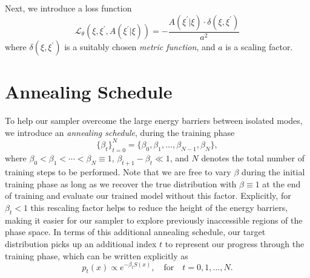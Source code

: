 \documentclass{article} %
\begin{document}
Next, we introduce a loss function
%
\begin{equation}
   \mathcal{L}_{\theta}{\left(\xi, \xi^{\prime}, A(\xi^{\prime}|\xi)\right)}
      = -\frac{A(\xi^{\prime}|\xi)\cdot \delta(\xi, \xi^{\prime})}{a^{2}}
\end{equation}
%
where \(\delta(\xi, \xi^{\prime})\) is a suitably chosen \emph{metric function}, and \(a\) is a scaling factor.
%
\section{\label{sec:annealing_schedule}Annealing Schedule}
%
To help our sampler overcome the large energy barriers between isolated modes, we introduce an \emph{annealing
schedule}, during the training phase
%
\begin{equation}
   {\{\beta_{t}\}}_{t=0}^{N} = \{\beta_{0}, \beta_{1}, \ldots, \beta_{N-1}, \beta_{N}\},
\end{equation}
%
where \(\beta_{0} < \beta_{1} < \cdots < \beta_{N} \equiv 1\), \(\beta_{t+1} - \beta_{t} \ll 1\), and \(N\) denotes the
total number of training steps to be performed.
%
Note that we are free to vary \(\beta\) during the initial training phase as long as we recover the true distribution
with \(\beta \equiv 1\) at the end of training and evaluate our trained model without this factor.
%
Explicitly, for \(\beta_{t} < 1\) this rescaling factor helps to reduce the height of the energy barriers, making it
easier for our sampler to explore previously inaccessible regions of the phase space.
%
In terms of this additional annealing schedule, our target distribution picks up an additional index \(t\) to represent
our progress through the training phase, which can be written explicitly as  
%
\begin{equation}
   p_{t}(x)\propto e^{-\beta_{t} S(x)}, \quad\text{for}\quad t = 0, 1, \ldots, N.
\end{equation}
%
\end{document}
